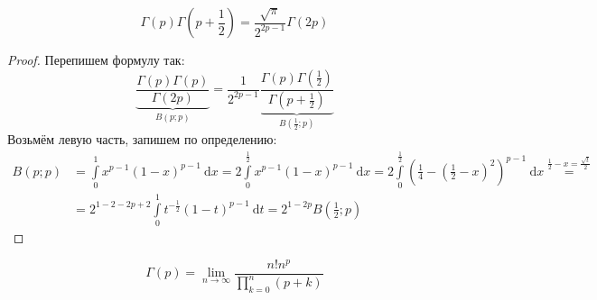 \documentclass{article}
\begin{document}
    \begin{property}
        $$
        \Gamma(p)\Gamma\left(p+\frac12\right)=\frac{\sqrt\pi}{2^{2p-1}}\Gamma(2p)
        $$
    \end{property}
    \begin{proof}
        Перепишем формулу так:
        $$
        \underbrace{\frac{\Gamma(p)\Gamma(p)}{\Gamma(2p)}}_{B(p;p)}=\frac1{2^{2p-1}}\underbrace{\frac{\Gamma(p)\Gamma(\frac12)}{\Gamma(p+\frac12)}}_{B(\frac12;p)}
        $$
        Возьмём левую часть, запишем по определению:
        \[\begin{split}
            B(p;p)&=\int\limits_0^1x^{p-1}(1-x)^{p-1}~\mathrm dx=2\int\limits_0^{\frac12}x^{p-1}(1-x)^{p-1}~\mathrm dx=2\int\limits_0^{\frac12}\left(\frac14-\left(\frac12-x\right)^2\right)^{p-1}~\mathrm dx\overset{\frac12-x=\frac{\sqrt t}2}=\\
            &=2^{1-2-2p+2}\int\limits_0^1t^{-\frac12}(1-t)^{p-1}~\mathrm dt=2^{1-2p}B\left(\frac12;p\right)
        \end{split}\]
    \end{proof}
    \begin{property}
        $$
        \Gamma(p)=\lim\limits_{n\to\infty}\frac{n!n^p}{\prod\limits_{k=0}^n(p+k)}
        $$
    \end{property}
\end{document}
